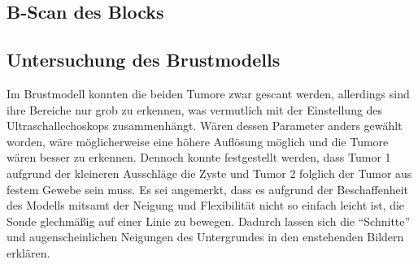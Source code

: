 \subsection{B-Scan des Blocks}

\subsection{Untersuchung des Brustmodells}
Im Brustmodell konnten die beiden Tumore zwar gescant werden, allerdings sind ihre Bereiche nur grob zu erkennen,
was vermutlich mit der Einstellung des Ultraschallechoskops zusammenhängt.
Wären dessen Parameter anders gewählt worden, wäre möglicherweise eine höhere Auflösung möglich und die Tumore wären besser zu erkennen.
Dennoch konnte festgestellt werden, dass Tumor 1 aufgrund der kleineren Ausschläge die Zyste und Tumor 2 folglich der Tumor aus 
festem Gewebe sein muss.
Es sei angemerkt, dass es aufgrund der Beschaffenheit des Modells mitsamt der Neigung und Flexibilität nicht so einfach leicht ist,
die Sonde glechmäßig auf einer Linie zu bewegen. 
Dadurch lassen sich die \enquote{Schnitte} und augenscheinlichen Neigungen des Untergrundes in den enstehenden Bildern erklären.
